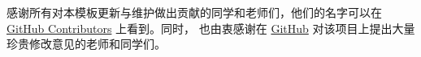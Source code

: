 \begin{acknowledgements}


感谢所有对本模板更新与维护做出贡献的同学和老师们，他们的名字可以在
\href{https://github.com/BITNP/BIThesis/graphs/contributors}{GitHub Contributors}
上看到。同时， 也由衷感谢在 \href{https://github.com/BITNP/BIThesis/issues?q=}{GitHub}
对该项目上提出大量珍贵修改意见的老师和同学们。


\end{acknowledgements}
